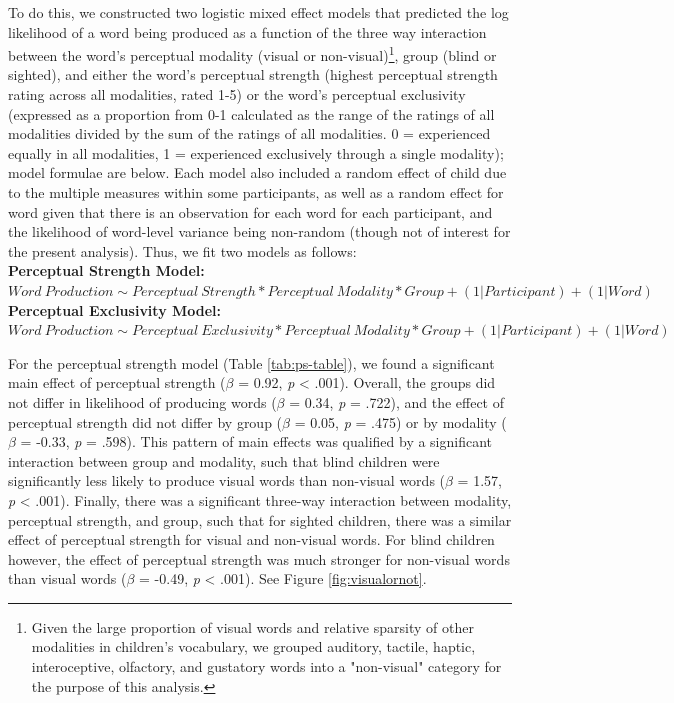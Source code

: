 \documentclass[
  man,floatsintext]{apa6}
\begin{document}
To do this, we constructed two logistic mixed effect models that predicted the log likelihood of a word being produced as a function of the three way interaction between the word's perceptual modality (visual or non-visual)\footnote{Given the large proportion of visual words and relative sparsity of other modalities in children's vocabulary, we grouped auditory, tactile, haptic, interoceptive, olfactory, and gustatory words into a "non-visual" category for the purpose of this analysis.}, group (blind or sighted), and either the word's perceptual strength (highest perceptual strength rating across all modalities, rated 1-5) or the word's perceptual exclusivity (expressed as a proportion from 0-1 calculated as the range of the ratings of all modalities divided by the sum of the ratings of all modalities. 0 = experienced equally in all modalities, 1 = experienced exclusively through a single modality); model formulae are below. Each model also included a random effect of child due to the multiple measures within some participants, as well as a random effect for word given that there is an observation for each word for each participant, and the likelihood of word-level variance being non-random (though not of interest for the present analysis). Thus, we fit two models as follows:\\
\textbf{Perceptual Strength Model:} \(Word\ Production \sim Perceptual\ Strength * Perceptual\ Modality * Group + (1|Participant) + (1|Word)\)\\
\textbf{Perceptual Exclusivity Model:} \(Word\ Production \sim Perceptual\ Exclusivity * Perceptual\ Modality * Group + (1|Participant) + (1|Word)\)

For the perceptual strength model (Table \ref{tab:ps-table}), we found a significant main effect of perceptual strength (\(\beta\) = 0.92, \emph{p} \textless{} .001). Overall, the groups did not differ in likelihood of producing words (\(\beta\) = 0.34, \emph{p} = .722), and the effect of perceptual strength did not differ by group (\(\beta\) = 0.05, \emph{p} = .475) or by modality (\(\beta\) = -0.33, \emph{p} = .598). This pattern of main effects was qualified by a significant interaction between group and modality, such that blind children were significantly less likely to produce visual words than non-visual words (\(\beta\) = 1.57, \emph{p} \textless{} .001). Finally, there was a significant three-way interaction between modality, perceptual strength, and group, such that for sighted children, there was a similar effect of perceptual strength for visual and non-visual words. For blind children however, the effect of perceptual strength was much stronger for non-visual words than visual words (\(\beta\) = -0.49, \emph{p} \textless{} .001). See Figure \ref{fig:visualornot}.
\end{document}
